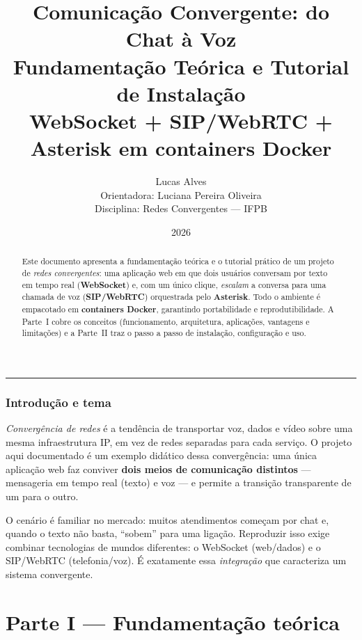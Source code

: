 \documentclass[11pt,a4paper]{article}
\title{\textbf{Comunicação Convergente: do Chat à Voz}\\[4pt]
\large Fundamentação Teórica e Tutorial de Instalação\\
\normalsize WebSocket + SIP/WebRTC + Asterisk em containers Docker}
\author{Lucas Alves \\ \small Orientadora: Luciana Pereira Oliveira \\ \small Disciplina: Redes Convergentes --- IFPB}
\date{2026}
\begin{document}
\maketitle

\begin{abstract}
\noindent Este documento apresenta a fundamentação teórica e o tutorial prático de um
projeto de \emph{redes convergentes}: uma aplicação web em que dois usuários conversam
por texto em tempo real (\textbf{WebSocket}) e, com um único clique, \emph{escalam} a
conversa para uma chamada de voz (\textbf{SIP/WebRTC}) orquestrada pelo \textbf{Asterisk}.
Todo o ambiente é empacotado em \textbf{containers Docker}, garantindo portabilidade e
reprodutibilidade. A Parte~I cobre os conceitos (funcionamento, arquitetura, aplicações,
vantagens e limitações) e a Parte~II traz o passo a passo de instalação, configuração e uso.
\end{abstract}

\tableofcontents
\bigskip
\hrule
\bigskip

\section{Introdução e tema}

\emph{Convergência de redes} é a tendência de transportar voz, dados e vídeo sobre uma
mesma infraestrutura IP, em vez de redes separadas para cada serviço. O projeto aqui
documentado é um exemplo didático dessa convergência: uma única aplicação web faz conviver
\textbf{dois meios de comunicação distintos} --- mensageria em tempo real (texto) e voz ---
e permite a transição transparente de um para o outro.

O cenário é familiar no mercado: muitos atendimentos começam por chat e, quando o texto não
basta, ``sobem'' para uma ligação. Reproduzir isso exige combinar tecnologias de mundos
diferentes: o WebSocket (web/dados) e o SIP/WebRTC (telefonia/voz). É exatamente essa
\emph{integração} que caracteriza um sistema convergente.

\part*{Parte I --- Fundamentação teórica}
\end{document}

